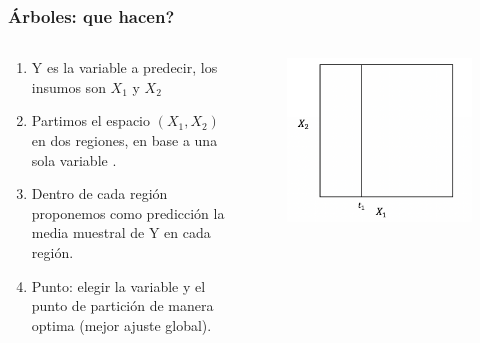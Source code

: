 \documentclass[
  shownotes,
  xcolor={svgnames},
  hyperref={colorlinks,citecolor=DarkBlue,linkcolor=DarkRed,urlcolor=DarkBlue}
  , aspectratio=169]{beamer}
\begin{document}
\begin{frame}[fragile]
\frametitle{Árboles: que hacen?}


\begin{columns}[T] %
\begin{column}{.42\textwidth}
  
\begin{enumerate}
    \footnotesize
\item Y es la variable a predecir, los insumos son $X_1$ y $X_2$
\item  Partimos el espacio $(X_1,X_2)$ en dos regiones, en base a una sola variable .
\item Dentro de cada región proponemos como predicción la media muestral de Y en cada región.
\item Punto: elegir la variable y el punto de partición de manera optima (mejor ajuste global).
\end{enumerate}


\end{column}  
\hfill
\begin{column}{.48\textwidth}

 \begin{figure}[H] \centering
            \captionsetup{justification=centering}
              \includegraphics[scale=0.4]{figures/cart_2}                           
 \end{figure}

\end{column}
\end{columns}

\end{frame}
\end{document}
